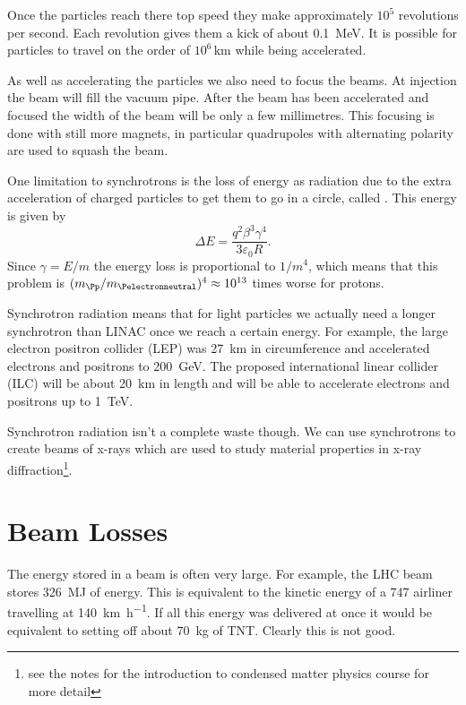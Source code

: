 \documentclass[fleqn]{NotesClass}
\begin{document}
    Once the particles reach there top speed they make approximately \(10^5\) revolutions per second.
    Each revolution gives them a kick of about \qty{0.1}{\mega\electronvolt}.
    It is possible for particles to travel on the order of \(10^6\,\unit{\kilo\metre}\) while being accelerated.
    
    As well as accelerating the particles we also need to focus the beams.
    At injection the beam will fill the vacuum pipe.
    After the beam has been accelerated and focused the width of the beam will be only a few millimetres.
    This focusing is done with still more magnets, in particular quadrupoles with alternating polarity are used to squash the beam.
    
    One limitation to synchrotrons is the loss of energy as radiation due to the extra acceleration of charged particles to get them to go in a circle, called .
    This energy is given by
    \begin{equation}
        \Delta E = \frac{q^2\beta^3\gamma^4}{3\varepsilon_{0}R}.
    \end{equation}
    Since \(\gamma = E/m\) the energy loss is proportional to \(1/m^4\), which means that this problem is \((m_{\Pp}/m_{\Pelectronneutral})^4 \approx 10^{13}\) times worse for protons.
    
    Synchrotron radiation means that for light particles we actually need a longer synchrotron than LINAC once we reach a certain energy.
    For example, the large electron positron collider (LEP) was \qty{27}{\kilo\metre} in circumference and accelerated electrons and positrons to \qty{200}{\giga\electronvolt}.
    The proposed international linear collider (ILC) will be about \qty{20}{\kilo\metre} in length and will be able to accelerate electrons and positrons up to \qty{1}{\tera\electronvolt}.
    
    Synchrotron radiation isn't a complete waste though.
    We can use synchrotrons to create beams of x-rays which are used to study material properties in x-ray diffraction\footnote{see the notes for the introduction to condensed matter physics course for more detail}.
    
    \section{Beam Losses}
    The energy stored in a beam is often very large.
    For example, the LHC beam stores \qty{326}{\mega\joule} of energy.
    This is equivalent to the kinetic energy of a 747 airliner travelling at \qty{140}{\kilo\metre\per\hour}.
    If all this energy was delivered at once it would be equivalent to setting off about \qty{70}{\kilogram} of TNT.
    Clearly this is not good.
    
\end{document}
